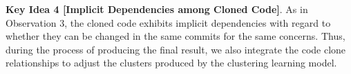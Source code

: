 \vspace{3pt}
{\bf Key Idea 4 [Implicit Dependencies among Cloned Code]}. As in
Observation 3, the cloned code exhibits implicit dependencies with
regard to whether they can be changed in the same commits for the same
concerns. Thus, during the process of producing the final
result, we also integrate the code clone relationships to
adjust the clusters produced by the clustering learning model.

